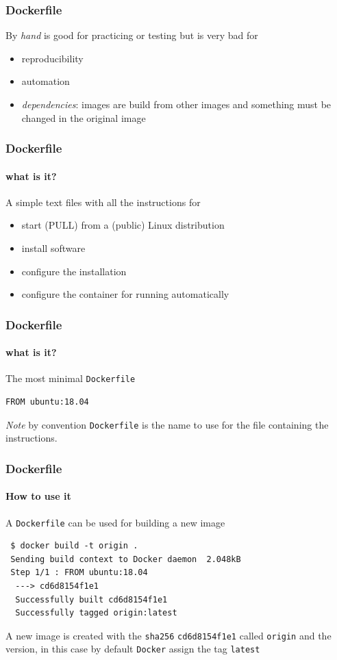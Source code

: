 \begin{frame}
\frametitle{Dockerfile}

By \textit{hand} is good for practicing or testing but is very bad for 

\begin{itemize}
\item reproducibility
\item automation
\item \textit{dependencies}: images are build from other images and something must be changed in the original image
\end{itemize}
\end{frame}

\begin{frame}
\frametitle{Dockerfile}
\framesubtitle{what is it?}

A simple text files with all the instructions for

\begin{itemize}
\item start (PULL) from a (public) Linux distribution
\item install software
\item configure the installation
\item configure the container for running automatically
\end{itemize}
\end{frame}

\begin{frame}[fragile]
\frametitle{Dockerfile}
\framesubtitle{what is it?}

The most minimal \lstinline!Dockerfile!
\begin{lstlisting}
FROM ubuntu:18.04
\end{lstlisting}

\textit{Note} by convention \lstinline!Dockerfile! is the name to use for the file containing the instructions.
\end{frame}


\begin{frame}[fragile]
\frametitle{Dockerfile}
\framesubtitle{How to use it}

A \lstinline!Dockerfile! can be used for building a new image

\begin{lstlisting}
 $ docker build -t origin .
 Sending build context to Docker daemon  2.048kB
 Step 1/1 : FROM ubuntu:18.04
  ---> cd6d8154f1e1
  Successfully built cd6d8154f1e1
  Successfully tagged origin:latest
\end{lstlisting}

A new image is created with the \lstinline!sha256! \lstinline!cd6d8154f1e1! called \lstinline!origin! and the version, in this case by default \lstinline!Docker! assign the tag \lstinline!latest!
\end{frame}

